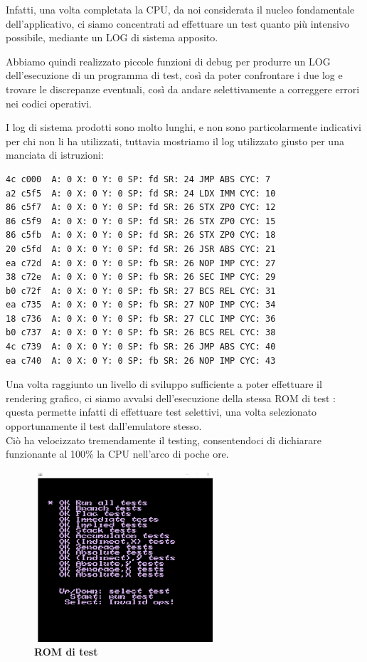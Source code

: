 \documentclass[11pt]{article}
\begin{document}
Infatti, una volta completata la CPU, da noi considerata il nucleo fondamentale dell'applicativo, ci siamo concentrati ad effettuare un test quanto più intensivo possibile, mediante un LOG di sistema apposito.

Abbiamo quindi realizzato piccole funzioni di debug per produrre un LOG dell'esecuzione di un programma di test, così da poter confrontare i due log e trovare le discrepanze eventuali, così da andare selettivamente a correggere errori nei codici operativi.

I log di sistema prodotti sono molto lunghi, e non sono particolarmente indicativi per chi non li ha utilizzati, tuttavia mostriamo il log utilizzato  giusto per una manciata di istruzioni:
\begin{lstlisting}
4c c000  A: 0 X: 0 Y: 0 SP: fd SR: 24 JMP ABS CYC: 7
a2 c5f5  A: 0 X: 0 Y: 0 SP: fd SR: 24 LDX IMM CYC: 10
86 c5f7  A: 0 X: 0 Y: 0 SP: fd SR: 26 STX ZP0 CYC: 12
86 c5f9  A: 0 X: 0 Y: 0 SP: fd SR: 26 STX ZP0 CYC: 15
86 c5fb  A: 0 X: 0 Y: 0 SP: fd SR: 26 STX ZP0 CYC: 18
20 c5fd  A: 0 X: 0 Y: 0 SP: fd SR: 26 JSR ABS CYC: 21
ea c72d  A: 0 X: 0 Y: 0 SP: fb SR: 26 NOP IMP CYC: 27
38 c72e  A: 0 X: 0 Y: 0 SP: fb SR: 26 SEC IMP CYC: 29
b0 c72f  A: 0 X: 0 Y: 0 SP: fb SR: 27 BCS REL CYC: 31
ea c735  A: 0 X: 0 Y: 0 SP: fb SR: 27 NOP IMP CYC: 34
18 c736  A: 0 X: 0 Y: 0 SP: fb SR: 27 CLC IMP CYC: 36
b0 c737  A: 0 X: 0 Y: 0 SP: fb SR: 26 BCS REL CYC: 38
4c c739  A: 0 X: 0 Y: 0 SP: fb SR: 26 JMP ABS CYC: 40
ea c740  A: 0 X: 0 Y: 0 SP: fb SR: 26 NOP IMP CYC: 43
\end{lstlisting}

Una volta raggiunto un livello di sviluppo sufficiente a poter effettuare il rendering grafico, ci siamo avvalsi dell'esecuzione della stessa ROM di test : questa permette infatti di effettuare test selettivi, una volta selezionato opportunamente il test dall'emulatore stesso.\\

Ciò ha velocizzato tremendamente il testing, consentendoci di dichiarare funzionante al 100\% la CPU nell'arco di poche ore.

\begin{figure}[h]
\hspace*{+0cm}
\centering
\includegraphics[width=256px, height=240px]{Nestest.png}\\
\small\textbf{ROM di test}
\end{figure}
\end{document}
